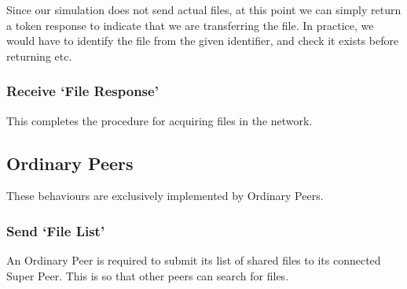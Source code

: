 Since our simulation does not send actual files, at this point we can simply
return a token response to indicate that we are transferring the file. In
practice, we would have to identify the file from the given identifier, and
check it exists before returning etc.

\begin{algorithm}[H]

  \;
\end{algorithm}

\subsubsection{Receive `File Response'}

This completes the procedure for acquiring files in the network.

\begin{algorithm}[H]

\end{algorithm}

\subsection{Ordinary Peers}

These behaviours are exclusively implemented by Ordinary Peers.

\subsubsection{Send `File List'}

An Ordinary Peer is required to submit its list of shared files to its connected
Super Peer.  This is so that other peers can search for files.

